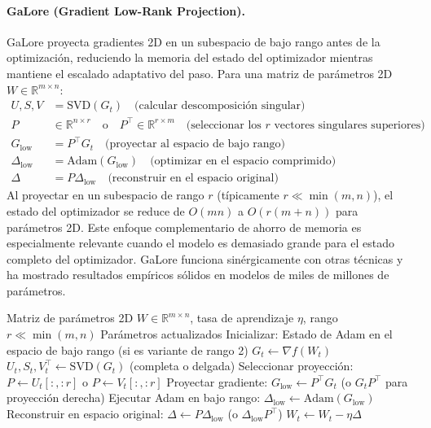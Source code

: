 \documentclass[11pt,a4paper]{article}
\begin{document}
\paragraph{GaLore (Gradient Low-Rank Projection).}
GaLore proyecta gradientes 2D en un subespacio de bajo rango antes de la optimización, reduciendo la memoria del estado del optimizador mientras mantiene el escalado adaptativo del paso. Para una matriz de parámetros 2D $W \in \mathbb{R}^{m \times n}$:
\begin{align}
U, S, V &= \text{SVD}(G_t) \quad\text{(calcular descomposición singular)} \\
P &\in \mathbb{R}^{n \times r} \quad\text{o} \quad P^\top \in \mathbb{R}^{r \times m} \quad\text{(seleccionar los $r$ vectores singulares superiores)} \\
G_{\text{low}} &= P^\top G_t \quad\text{(proyectar al espacio de bajo rango)} \\
\Delta_{\text{low}} &= \text{Adam}(G_{\text{low}}) \quad\text{(optimizar en el espacio comprimido)} \\
\Delta &= P \Delta_{\text{low}} \quad\text{(reconstruir en el espacio original)}
\end{align}
Al proyectar en un subespacio de rango $r$ (típicamente $r \ll \min(m,n)$), el estado del optimizador se reduce de $O(mn)$ a $O(r(m+n))$ para parámetros 2D. Este enfoque complementario de ahorro de memoria es especialmente relevante cuando el modelo es demasiado grande para el estado completo del optimizador. GaLore funciona sinérgicamente con otras técnicas y ha mostrado resultados empíricos sólidos en modelos de miles de millones de parámetros.

\begin{algorithm}[H]
\caption{GaLore (Gradient Low-Rank Projection)}
\label{alg:galore}
\begin{algorithmic}[1]
\Require Matriz de parámetros 2D $W \in \mathbb{R}^{m \times n}$, tasa de aprendizaje $\eta$, rango $r \ll \min(m,n)$
\Ensure Parámetros actualizados
\State Inicializar: Estado de Adam en el espacio de bajo rango (si es variante de rango 2)
    \State $G_t \gets \nabla f(W_t)$
      
        \State $U_t, S_t, V_t^\top \gets \text{SVD}(G_t)$ (completa o delgada)
        \State Seleccionar proyección: $P \gets U_t[:, :r]$ o $P \gets V_t[:, :r]$
    \EndIf
    \State Proyectar gradiente: $G_{\text{low}} \gets P^\top G_t$ (o $G_t P^\top$ para proyección derecha)
    \State Ejecutar Adam en bajo rango: $\Delta_{\text{low}} \gets \text{Adam}(G_{\text{low}})$
    \State Reconstruir en espacio original: $\Delta \gets P \Delta_{\text{low}}$ (o $\Delta_{\text{low}} P^\top$)
    \State $W_t \gets W_t - \eta \Delta$
\EndFor
\end{algorithmic}
\end{algorithm}
\end{document}
